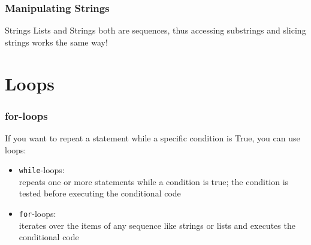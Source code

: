 \documentclass{beamer}
\begin{document}
\begin{frame}
\frametitle{Manipulating Strings}
	\begin{alertblock}{Strings}
		Lists and Strings both are sequences, thus accessing substrings and slicing strings works the same way!
	\end{alertblock}
	
\end{frame}

\section{Loops}

\begin{frame}
\frametitle{for-loops}
	If you want to repeat a statement while a specific condition is True, you can use loops:
	\begin{itemize}
		\item \texttt{while}-loops: \\ repeats one or more statements while a condition is true; the condition is tested before executing the conditional code
		\item \texttt{for}-loops: \\ iterates over the items of any sequence like strings or lists and executes the conditional code
	\end{itemize}
\end{frame}
\end{document}

